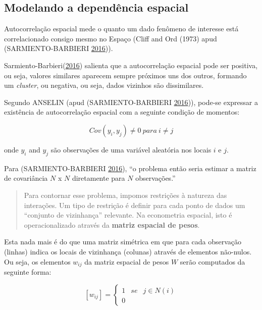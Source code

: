 \documentclass[12pt,]{article}
\begin{document}
\subsection{Modelando a dependência
espacial}\label{modelando-a-dependencia-espacial}

Autocorrelação espacial mede o quanto um dado fenômeno de interesse está
correlacionado consigo mesmo no Espaço (Cliff and Ord (1973) apud
(SARMIENTO-BARBIERI \protect\hyperlink{ref-sarmiento-barbieri}{2016})).

Sarmiento-Barbieri(\protect\hyperlink{ref-sarmiento-barbieri}{2016})
salienta que a autocorrelação espacial pode ser positiva, ou seja,
valores similares aparecem sempre próximos uns dos outros, formando um
\emph{cluster}, ou negativa, ou seja, dados vizinhos são dissimilares.

Segundo ANSELIN (apud (SARMIENTO-BARBIERI
\protect\hyperlink{ref-sarmiento-barbieri}{2016})), pode-se expressar a
existência de autocorrelação espacial com a seguinte condição de
momentos:

\begin{equation}
  \label{eq-cov}
  Cov(y_i,y_j) \neq  0\ para\ i \neq  j
\end{equation}

onde \(y_i\) and \(y_j\) são observações de uma variável aleatória nos
locais \(i\) e \(j\).

Para (SARMIENTO-BARBIERI
\protect\hyperlink{ref-sarmiento-barbieri}{2016}), ``o problema então
seria estimar a matriz de covariância \(N\) x \(N\) diretamente para
\(N\) observações.''

\begin{quote}
Para contornar esse problema, impomos restrições à natureza das
interações. Um tipo de restrição é definir para cada ponto de dados um
``conjunto de vizinhança'' relevante. Na econometria espacial, isto é
operacionalizado através da \textbf{matriz espacial de pesos}.
\end{quote}

Esta nada mais é do que uma matriz simétrica em que para cada observação
(linhas) indica os locais de vizinhança (colunas) através de elementos
não-nulos. Ou seja, os elementos \(w_{ij}\) da matriz espacial de pesos
\(W\) serão computados da seguinte forma:

\begin{equation}
  \label{eq-W}
  [w_{ij}] = \left\{\begin{matrix}
  1 & se & j \in N(i)\\ 
  0 & 
\end{matrix}\right.
\end{equation}
\end{document}

